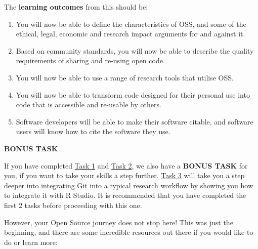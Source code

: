 \documentclass[]{book}
\begin{document}
The \textbf{learning outcomes} from this should be:

\begin{enumerate}
\def\labelenumi{\arabic{enumi}.}
\item
  You will now be able to define the characteristics of OSS, and some of the ethical, legal, economic and research impact arguments for and against it.
\item
  Based on community standards, you will now be able to describe the quality requirements of sharing and re-using open code.
\item
  You will now be able to use a range of research tools that utilise OSS.
\item
  You will now be able to transform code designed for their personal use into code that is accessible and re-usable by others.
\item
  Software developers will be able to make their software citable, and software users will know how to cite the software they use.
\end{enumerate}

\textbf{BONUS TASK}

If you have completed \href{https://github.com/OpenScienceMOOC/Module-5-Open-Research-Software-and-Open-Source/blob/master/content_development/Task_1.md}{Task 1} and \href{https://github.com/OpenScienceMOOC/Module-5-Open-Research-Software-and-Open-Source/blob/master/content_development/Task_2.md}{Task 2}, we also have a \textbf{BONUS TASK} for you, if you want to take your skills a step further. \href{https://github.com/OpenScienceMOOC/Module-5-Open-Research-Software-and-Open-Source/blob/master/content_development/Task_3.md}{Task 3} will take you a step deeper into integrating Git into a typical research workflow by showing you how to integrate it with R Studio. It is recommended that you have completed the first 2 tasks before proceeding with this one.

However, your Open Source journey does not stop here! This was just the beginning, and there are some incredible resources out there if you would like to do or learn more:
\end{document}
